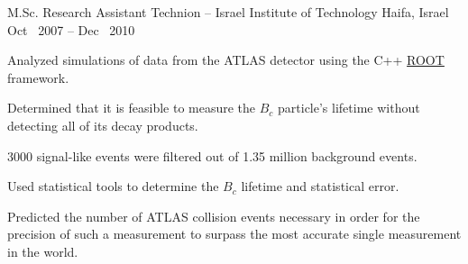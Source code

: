 \begin{cventries}
    \cventryWithTags
    {M.Sc. Research Assistant} %
    {Technion -- Israel Institute of Technology} %
    {Haifa, Israel} %
    {Oct \ 2007 -- Dec \ 2010} %
    {    \fbox{\LaTeX}} %
    {
      \begin{cvitems} %
        \item {Analyzed simulations of data from the ATLAS detector using the C++ \hypersetup{urlcolor=blue}\href{https://root.cern.ch/}{ROOT} framework.}
        \item {Determined that it is feasible to measure the $B_c$ particle's lifetime without detecting all of its decay products.}
        \item {3000 signal-like events were filtered out of 1.35 million background events.}
        \item {Used statistical tools to determine the $B_c$ lifetime and statistical error.}
        \item {Predicted the number of ATLAS collision events necessary in order for the precision of such a measurement to surpass the most accurate single measurement in the world.}
      \end{cvitems}
    }
  \end{cventries}
